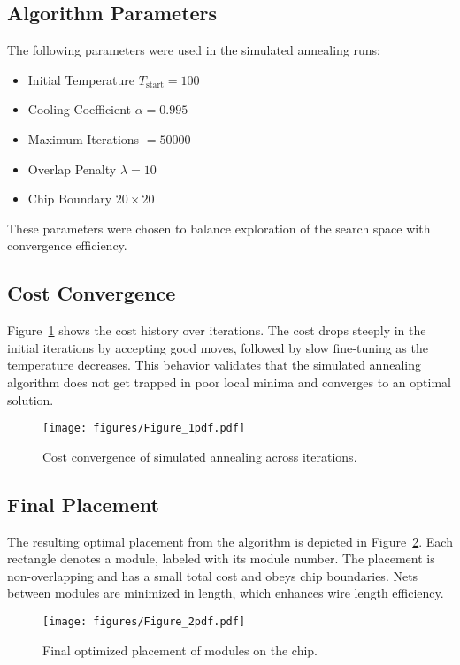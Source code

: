 \documentclass[9pt,a4paper,twoside]{rho-class/rho}
\begin{document}
\subsection{Algorithm Parameters}
The following parameters were used in the simulated annealing runs:
\begin{itemize}
    \item Initial Temperature $T_{\text{start}} = 100$
    \item Cooling Coefficient $\alpha = 0.995$
    \item Maximum Iterations $= 50000$
    \item Overlap Penalty $\lambda = 10$
    \item Chip Boundary $20 \times 20$
\end{itemize}

These parameters were chosen to balance exploration of the search space with convergence efficiency.

\subsection{Cost Convergence}
Figure~\ref{fig:cost_convergence} shows the cost history over iterations. The cost drops steeply in the initial iterations by accepting good moves, followed by slow fine-tuning as the temperature decreases. This behavior validates that the simulated annealing algorithm does not get trapped in poor local minima and converges to an optimal solution. 

\begin{figure}[h!]
    \centering
    \texttt{[image: figures/Figure\_1pdf.pdf]}
    \caption{Cost convergence of simulated annealing across iterations.}
    \label{fig:cost_convergence}
\end{figure}

\subsection{Final Placement}
The resulting optimal placement from the algorithm is depicted in  Figure~\ref{fig:placement}. Each rectangle denotes a module, labeled with its module number. The placement is non-overlapping and has a small total cost and obeys chip boundaries. Nets between modules are minimized in length, which enhances wire length efficiency.

 

\begin{figure}[h!]
    \centering
    \texttt{[image: figures/Figure\_2pdf.pdf]}
    \caption{Final optimized placement of modules on the chip.}
    \label{fig:placement}
\end{figure}
\end{document}
